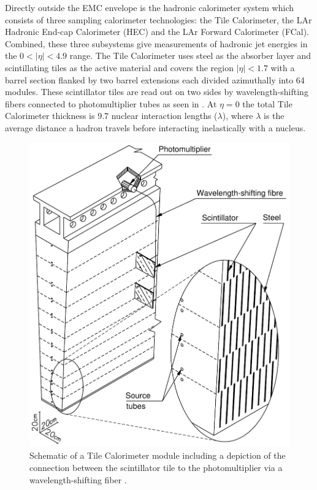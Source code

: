 Directly outside the EMC envelope is the hadronic calorimeter system
\cite{PERF-2007-01} which consists of three sampling calorimeter technologies:
the Tile Calorimeter, the LAr Hadronic End-cap Calorimeter (HEC) and the LAr
Forward Calorimeter (FCal).  Combined, these three subsystems give measurements
of hadronic jet energies in the $0 <|\eta| < 4.9$ range. The Tile Calorimeter
uses steel as the absorber layer and scintillating tiles as the active material
and covers the region $|\eta| < 1.7$ with a barrel section flanked by two barrel
extensions each divided azimuthally into 64 modules.  These scintillator tiles
are read out on two sides by wavelength-shifting fibers connected to
photomultiplier tubes as seen in . At $\eta =
0$ the total Tile Calorimeter thickness is 9.7 nuclear interaction lengths
($\lambda$), where $\lambda$ is the average distance a hadron travels before
interacting inelastically with a nucleus.
\begin{figure}[!htbp]
  \begin{center}
    \includegraphics[width=0.8\linewidth]{figures/atlas/tile_calorimeter.pdf}
    \caption{Schematic of a Tile Calorimeter module
including a depiction of the connection between the scintillator tile to the
photomultiplier via a wavelength-shifting fiber \cite{PERF-2007-01}.}
    \label{fig:tile_calorimeter}
  \end{center}
\end{figure}


